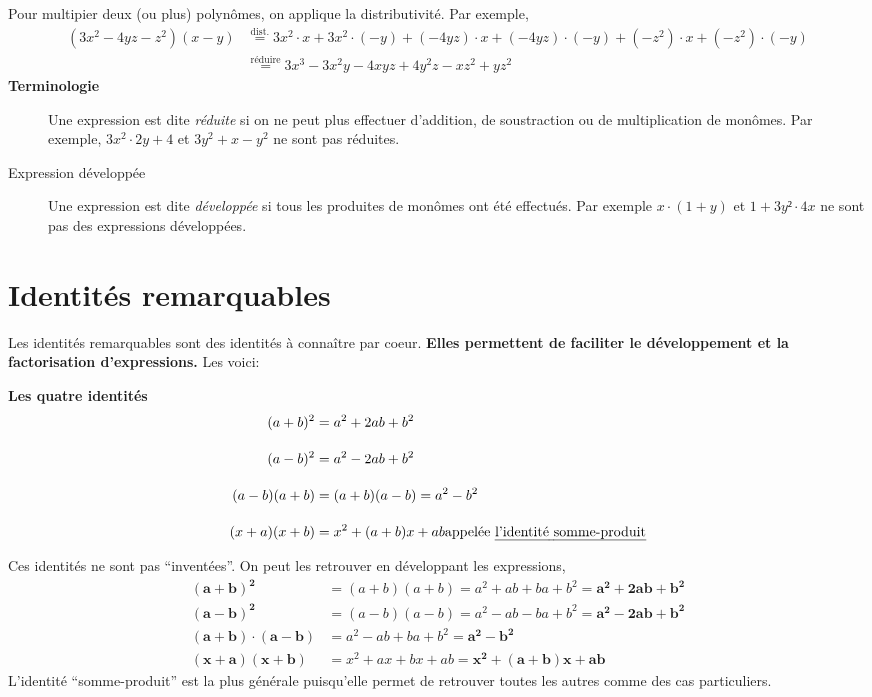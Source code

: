 \documentclass[a4paper,12pt]{report}
\begin{document}
Pour multipier deux (ou plus) polynômes, on applique la distributivité. Par exemple, 
\begin{align*}
(3x^2-4yz-z^2)(x-y)&\stackrel{\text{dist.}}{=}3x^2\cdot x+3x^2\cdot (-y)+(-4yz)\cdot x+(-4yz)\cdot (-y)+(-z^2)\cdot x+(-z^2)\cdot (-y)\\
&\stackrel{\text{réduire}}{=}3x^3-3x^2y-4xyz+4y^2z-xz^2+yz^2
\end{align*}
{\bfseries Terminologie} 
\begin{description}
	\item[] Une expression est dite \emph{réduite} si on ne peut plus effectuer d'addition, de soustraction ou de multiplication de monômes. Par exemple, $3x^2\cdot 2y+4$ et $3y^2+x-y^2$ ne sont pas réduites.
	
	\item[Expression développée] Une expression est dite \emph{développée} si tous les produites de monômes ont été effectués. Par exemple $x\cdot (1+y)$ et $1+3y²\cdot 4x$ ne sont pas des expressions développées.
\end{description}

\section{Identités remarquables}
Les identités remarquables sont des identités à connaître par coeur. {\bfseries Elles permettent de faciliter le développement et la factorisation d'expressions.}
Les voici:

\begin{center}
{\bfseries Les quatre identités}
\begin{align}
	(a+b)^2&=a^2+2ab+b^2\\[1em]
	(a-b)^2&=a^2-2ab+b^2\\[1em]
	(a-b)(a+b)&=(a+b)(a-b)=a^2-b^2\\[1em]
	(x+a)(x+b)&=x^2+(a+b)x+ab \text{appelée \emph{l'identité somme-produit}}
\end{align}
\end{center}
Ces identités ne sont pas \enquote{inventées}.
On peut les retrouver en développant les expressions,
\begin{align*}
	\bm{(a+b)^2}&=(a+b)(a+b)=a^2+ab+ba+b^2=\bm{a^2+2ab+b^2}\\[1em]
	\bm{(a-b)^2}&=(a-b)(a-b)=a^2-ab-ba+b^2=\bm{a^2-2ab+b^2}\\[1em]
	\bm{(a+b)\cdot (a-b)}&=a^2-ab+ba+b^2=\bm{a^2-b^2}\\[1em]
	\bm{(x+a)(x+b)}&=x^2+ax+bx+ab=\bm{x^2+(a+b)x+ab}
\end{align*}
L'identité \enquote{somme-produit} est la plus générale puisqu'elle permet de retrouver toutes les autres comme des cas particuliers. 
\end{document}
